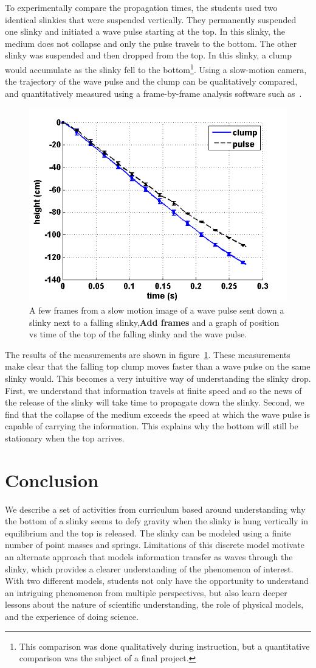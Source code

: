 \documentclass[pre,preprint,superscriptaddress,longbibliography]{revtex4-1}
\newcommand{\fig}[1]{figure~\ref{fig:#1}}
\newcommand{\FIGclumppulse}{
\begin{figure}[t]\center
\includegraphics[width=\columnwidth]{./img/ClumpPulse.png}
\caption{\label{fig:clumppulse} A few frames from a slow motion image of a wave pulse sent down a slinky next to a falling slinky,\textbf{Add frames} and a graph of position vs time of the top of the falling slinky and the wave pulse.}
\end{figure}
}
\begin{document}
To experimentally compare the propagation times, the students used two identical slinkies that were suspended vertically.
They permanently suspended one slinky and initiated a wave pulse starting at the top.
In this slinky, the medium does not collapse and only the pulse travels to the bottom. The other slinky was suspended and then dropped from the top. In this
slinky, a clump would accumulate as the slinky fell to the bottom\footnote{This comparison was done qualitatively during instruction, but a quantitative comparison was the subject of a final project.}. Using a slow-motion camera, the trajectory of the wave pulse
and the clump can be qualitatively compared, and quantitatively measured using a frame-by-frame analysis software such as~\cite{tracker}.

\FIGclumppulse

The results of the measurements are shown in \fig{clumppulse}. 
These measurements make clear that the falling top clump moves faster than a wave pulse on the same slinky would. 
This becomes a very intuitive way of understanding the slinky drop. 
First, we understand that information travels at finite speed and so the news of the release of the slinky will take time to propagate down the slinky.
Second, we find that the collapse of the medium exceeds the speed at which  the wave pulse is capable of carrying the information. This explains why the bottom will still be stationary when the top arrives.

\section{Conclusion}
We describe a set of activities from curriculum based around understanding why the bottom of a slinky seems to defy gravity when the slinky is hung vertically in equilibrium and the top is released.  The slinky can be modeled using a finite number of point masses and springs. Limitations of this discrete model motivate an alternate approach that models information transfer as waves through the slinky, which provides a clearer understanding of the phenomenon of interest.  With two different models, students not only have the opportunity to understand an intriguing phenomenon from multiple perspectives, but also learn deeper lessons about the nature of scientific understanding, the role of physical models, and the experience of doing science.


\end{document}
